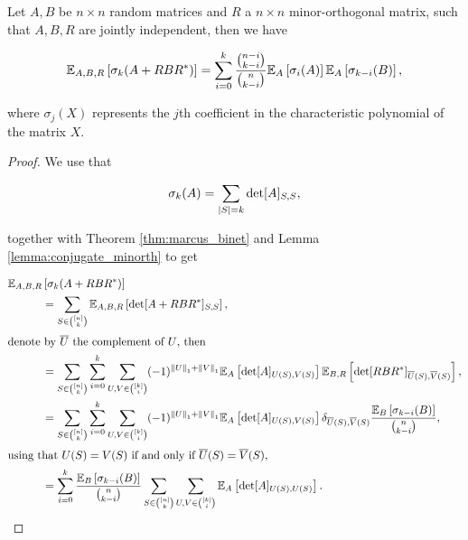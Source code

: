 \begin{theorem} \label{thm:implies_symmad}
    Let $A, B$ be $n\times n$ random matrices and $R$ a $n\times n$ minor-orthogonal matrix, such that $A, B, R$ are jointly independent, then we have

    \begin{equation*}
        \mathbb E_{A,B,R}\left[ \sigma_k(A + RBR^*) \right] =  \sum_{i=0}^k \frac{\binom{n-i}{k-i}}{\binom{n}{k-i}}\mathbb E_{A} \left[\sigma_i(A)\right] \mathbb E_{A}\left[\sigma_{k-i}(B)\right],
    \end{equation*}

    \noindent where $\sigma_j(X)$ represents the $j$th coefficient in the characteristic polynomial of the matrix $X$.
\end{theorem}

\begin{proof}
    We use that

    \begin{equation*}
        \sigma_k(A) = \sum_{\lvert S \rvert=k} \det[A]_{S,S},
    \end{equation*}

    \noindent together with Theorem \ref{thm:marcus_binet} and Lemma \ref{lemma:conjugate_minorth} to get %

    \begin{align*}
        \mathbb E_{A,B,R}&\left[ \sigma_k(A + RBR^*) \right]\\ &= \sum_{S \in \binom{[n]}{k}} \mathbb E_{A,B,R} \left[ \det[A + RBR^*]_{S,S} \right],\\ 
        \intertext{denote by $\overline U$ the complement of $U$, then}
        &= \sum_{S\in\binom{[n]}{k}} \sum_{i=0}^k \sum_{U,V\in \binom{[k]}{i}} (-1)^{\left\lVert U\right\rVert_1 + \left\lVert V\right\rVert_1} \mathbb E_A\left[ \det [A]_{U(S),V(S)} \right] \mathbb E_{B,R}\left[ \det[RBR^*]_{\overline{U}(S),\overline{V}(S)} \right],\\ 
        &= \sum_{S\in\binom{[n]}{k}} \sum_{i=0}^k \sum_{U,V\in \binom{[k]}{i}} (-1)^{\left\lVert U\right\rVert_1 + \left\lVert V\right\rVert_1} \mathbb E_A\left[ \det[A]_{U(S),V(S)} \right] \delta_{\overline{U}(S),\overline{V}(S)} \frac{\mathbb E_{B}\left[ \sigma_{k-i}(B)\right]}{\binom{n}{k-i}},\\ 
        \intertext{using that $U(S)=V(S)$ if and only if $\overline{U}(S) = \overline{V}(S)$,}
        &= \sum_{i=0}^k \frac{\mathbb E_{B}\left[ \sigma_{k-i}(B)\right]}{\binom{n}{k-i}} \sum_{S\in\binom{[n]}{k}} \sum_{U,V\in \binom{[k]}{i}}  \mathbb E_A\left[\det[A]_{U(S),U(S)} \right].
    \end{align*}


\end{proof}
